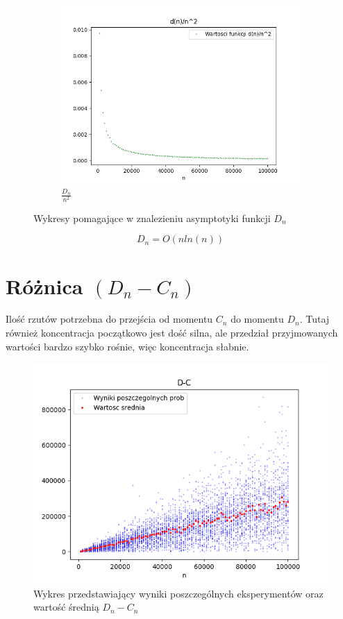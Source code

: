 \documentclass{report}
\begin{document}
\begin{figure}[H]
\begin{subfigure}{.5\textwidth}
            \centering
            \includegraphics[width=1.2\linewidth]{plotdnfunc3.png}
            \caption{\( \frac{D_n}{n^2} \)}
            \label{fig:plotdnfunc3}
          \end{subfigure}
        \caption{Wykresy pomagające w znalezieniu asymptotyki funkcji \(D_n\)}
        \label{fig:dn}
    \end{figure}
    \[D_n=O(nln(n))\]



\section*{Różnica \((D_n-C_n)\)}
\justifying
Ilość rzutów potrzebna do przejścia od momentu \(C_n\) do momentu \(D_n\).
Tutaj również koncentracja początkowo jest dość silna, ale przedział
przyjmowanych wartości bardzo szybko rośnie, więc koncentracja słabnie.
    \begin{figure}[htp]
        \centering
        \includegraphics[scale=0.7]{plotD-C.png}
        \caption[Example .]{Wykres przedstawiający wyniki poszczególnych eksperymentów oraz wartość średnią \(D_{n}-C_{n}\)}
        \label{plotDC}
    \end{figure}
\end{document}
